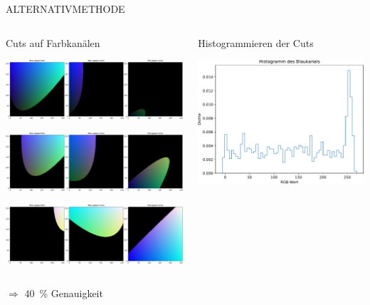 \begin{frame}[t]{ALTERNATIVMETHODE}
  \begin{columns}
    \begin{column}{0.5\textwidth}
      Cuts auf Farbkanälen

      \centering
      \includegraphics[width=\textwidth]{content/colorcuts1.pdf}

      \includegraphics[width=\textwidth]{content/colorcuts2.pdf}

      \includegraphics[width=\textwidth]{content/colorcuts3.pdf}
    \end{column}
    \begin{column}{0.5\textwidth}
      Histogrammieren der Cuts

      \centering
      \includegraphics[width=\textwidth]{content/hist.pdf}
    \end{column}
  \end{columns}
  \centering

  $\Rightarrow$ \SI{40}{\percent} Genauigkeit
\end{frame}
